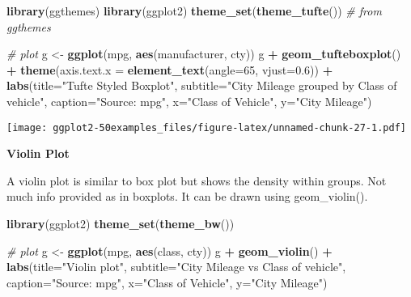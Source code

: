 \documentclass[a4paper]{article}
\newenvironment{Shaded}{\begin{snugshade}}{\end{snugshade}}
\newcommand{\KeywordTok}[1]{\textcolor[rgb]{0.13,0.29,0.53}{\textbf{#1}}}
\newcommand{\DataTypeTok}[1]{\textcolor[rgb]{0.13,0.29,0.53}{#1}}
\newcommand{\DecValTok}[1]{\textcolor[rgb]{0.00,0.00,0.81}{#1}}
\newcommand{\FloatTok}[1]{\textcolor[rgb]{0.00,0.00,0.81}{#1}}
\newcommand{\StringTok}[1]{\textcolor[rgb]{0.31,0.60,0.02}{#1}}
\newcommand{\CommentTok}[1]{\textcolor[rgb]{0.56,0.35,0.01}{\textit{#1}}}
\newcommand{\OperatorTok}[1]{\textcolor[rgb]{0.81,0.36,0.00}{\textbf{#1}}}
\newcommand{\NormalTok}[1]{#1}
\begin{document}
\begin{Shaded}
\begin{Highlighting}[]
\KeywordTok{library}\NormalTok{(ggthemes)}
\KeywordTok{library}\NormalTok{(ggplot2)}
\KeywordTok{theme_set}\NormalTok{(}\KeywordTok{theme_tufte}\NormalTok{())  }\CommentTok{# from ggthemes}

\CommentTok{# plot}
\NormalTok{g <-}\StringTok{ }\KeywordTok{ggplot}\NormalTok{(mpg, }\KeywordTok{aes}\NormalTok{(manufacturer, cty))}
\NormalTok{g }\OperatorTok{+}\StringTok{ }\KeywordTok{geom_tufteboxplot}\NormalTok{() }\OperatorTok{+}\StringTok{ }
\StringTok{      }\KeywordTok{theme}\NormalTok{(}\DataTypeTok{axis.text.x =} \KeywordTok{element_text}\NormalTok{(}\DataTypeTok{angle=}\DecValTok{65}\NormalTok{, }\DataTypeTok{vjust=}\FloatTok{0.6}\NormalTok{)) }\OperatorTok{+}\StringTok{ }
\StringTok{      }\KeywordTok{labs}\NormalTok{(}\DataTypeTok{title=}\StringTok{"Tufte Styled Boxplot"}\NormalTok{, }
           \DataTypeTok{subtitle=}\StringTok{"City Mileage grouped by Class of vehicle"}\NormalTok{,}
           \DataTypeTok{caption=}\StringTok{"Source: mpg"}\NormalTok{,}
           \DataTypeTok{x=}\StringTok{"Class of Vehicle"}\NormalTok{,}
           \DataTypeTok{y=}\StringTok{"City Mileage"}\NormalTok{)}
\end{Highlighting}
\end{Shaded}

\texttt{[image: ggplot2-50examples\_files/figure-latex/unnamed-chunk-27-1.pdf]}

\newpage

\textbf{Violin Plot}

A violin plot is similar to box plot but shows the density within
groups. Not much info provided as in boxplots. It can be drawn using
geom\_violin().

\begin{Shaded}
\begin{Highlighting}[]
\KeywordTok{library}\NormalTok{(ggplot2)}
\KeywordTok{theme_set}\NormalTok{(}\KeywordTok{theme_bw}\NormalTok{())}

\CommentTok{# plot}
\NormalTok{g <-}\StringTok{ }\KeywordTok{ggplot}\NormalTok{(mpg, }\KeywordTok{aes}\NormalTok{(class, cty))}
\NormalTok{g }\OperatorTok{+}\StringTok{ }\KeywordTok{geom_violin}\NormalTok{() }\OperatorTok{+}\StringTok{ }
\StringTok{  }\KeywordTok{labs}\NormalTok{(}\DataTypeTok{title=}\StringTok{"Violin plot"}\NormalTok{, }
       \DataTypeTok{subtitle=}\StringTok{"City Mileage vs Class of vehicle"}\NormalTok{,}
       \DataTypeTok{caption=}\StringTok{"Source: mpg"}\NormalTok{,}
       \DataTypeTok{x=}\StringTok{"Class of Vehicle"}\NormalTok{,}
       \DataTypeTok{y=}\StringTok{"City Mileage"}\NormalTok{)}
\end{Highlighting}
\end{Shaded}
\end{document}

